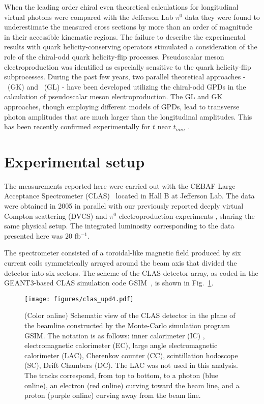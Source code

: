 \documentclass[prc,aps,floatfix,showpacs,showkeys,twocolumn,superscriptaddress,letterpaper,10pt]{revtex4-1}
\begin{document}
When the leading order chiral even theoretical calculations for longitudinal virtual photons were compared with the Jefferson Lab $\pi^0$ data \cite{Bedlinskiy:2012be,Bedlinskiy:2014tvi}  
they were  found  to  underestimate the measured cross sections by more than an order of magnitude in their accessible kinematic regions.
The failure to describe the experimental results with quark helicity-conserving operators  stimulated a consideration of the role of the  chiral-odd quark helicity-flip processes. Pseudoscalar meson electroproduction was identified 
as especially sensitive to the quark helicity-flip subprocesses. 
During the past few years, two parallel theoretical approaches -  
\cite{Goloskokov:2009iac,Goloskokov:2011rd}~(GK)  and 
\cite{Ahmad:2008hp} ~(GL) - have been developed utilizing the  chiral-odd GPDs in the calculation of pseudoscalar meson electroproduction. The GL and GK approaches, though employing different models of  GPDs, lead to  transverse photon amplitudes that are much larger than the longitudinal amplitudes. This has been recently confirmed experimentally for  $t$  near $t_{min}$ \cite{Defurne:2016eiy}.






\section{Experimental setup}

The measurements reported here were carried out with the CEBAF Large Acceptance Spectrometer 
(CLAS)~\cite{Mecking:2003zu} 
located in Hall B at Jefferson Lab. The data were obtained   in 2005 in parallel with our previously reported deeply virtual Compton scattering (DVCS) and $\pi^0$ electroproduction experiments 
\cite{Bedlinskiy:2012be,Bedlinskiy:2014tvi,girod:2007jq, Jo:2015ema,DeMasi:2007id}, 
sharing the same physical  setup. 
The integrated luminosity corresponding to the data presented here  
 was $20$ fb$^{-1}$.

The spectrometer consisted of a toroidal-like magnetic field produced by six current coils symmetrically arrayed around the beam axis that divided the detector into six sectors.  The scheme of the CLAS detector array, as coded in the GEANT3-based CLAS simulation code GSIM~\cite{GSIM_User_Guide},
is shown in Fig.~\ref{fig:clas}.

\begin{figure}
\texttt{[image: figures/clas\_upd4.pdf]}
\caption{(Color online) Schematic view of the CLAS detector in the plane of the beamline constructed by the Monte-Carlo simulation program GSIM.  The notation is as follows: inner calorimeter (IC) , electromagnetic calorimeter (EC), large angle electromagnetic calorimeter (LAC), Cherenkov counter (CC), scintillation hodoscope (SC), Drift Chambers (DC).  The LAC was not used in this analysis. The tracks correspond, from top to bottom,  to a photon (blue online), an electron (red online) curving toward the beam line, and a proton (purple online) curving away from the beam line. }
\label{fig:clas}
\end{figure}
\end{document}
